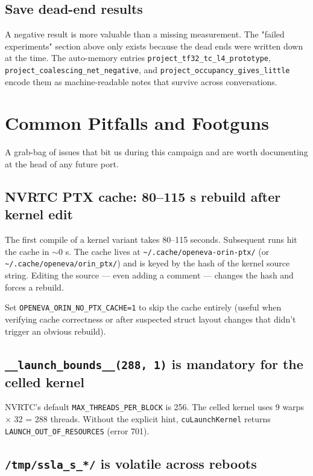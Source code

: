 \documentclass[11pt,a4paper]{article}
\begin{document}
\subsection{Save dead-end results}

A negative result is more valuable than a missing measurement. The
"failed experiments" section above only exists because the dead ends
were written down at the time. The auto-memory entries
\texttt{project\_tf32\_tc\_l4\_prototype}, \texttt{project\_coalescing\_net\_negative},
and \texttt{project\_occupancy\_gives\_little} encode them as machine-readable
notes that survive across conversations.

\section{Common Pitfalls and Footguns}

A grab-bag of issues that bit us during this campaign and are worth
documenting at the head of any future port.

\subsection{NVRTC PTX cache: 80--115 s rebuild after kernel edit}

The first compile of a kernel variant takes 80--115 seconds. Subsequent
runs hit the cache in $\sim$0 s. The cache lives at
\texttt{\~{}/.cache/openeva-orin-ptx/} (or
\texttt{\~{}/.cache/openeva/orin\_ptx/}) and is keyed by the hash of the
kernel source string. Editing the source --- even adding a comment ---
changes the hash and forces a rebuild.

Set \texttt{OPENEVA\_ORIN\_NO\_PTX\_CACHE=1} to skip the cache entirely
(useful when verifying cache correctness or after suspected struct
layout changes that didn't trigger an obvious rebuild).

\subsection{\texttt{\_\_launch\_bounds\_\_(288, 1)} is mandatory for the celled kernel}

NVRTC's default \texttt{MAX\_THREADS\_PER\_BLOCK} is 256. The celled
kernel uses 9 warps $\times$ 32 = 288 threads. Without the explicit
hint, \texttt{cuLaunchKernel} returns
\texttt{LAUNCH\_OUT\_OF\_RESOURCES} (error 701).

\subsection{\texttt{/tmp/ssla\_s\_*/} is volatile across reboots}
\end{document}
